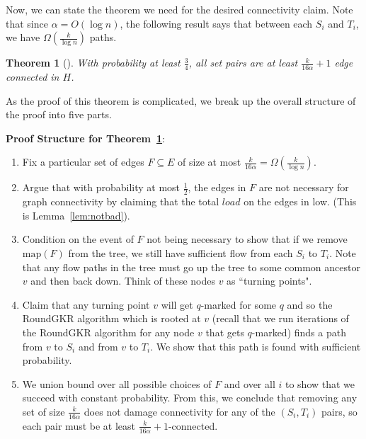 \documentclass[12pt]{article}
\newtheorem{theorem}{Theorem}
\begin{document}
Now, we can state the theorem we need for the desired connectivity claim. Note that since $\alpha = O(\log n)$, the following result says that between each $S_i$ and $T_i$, we have $\Omega(\frac{k}{\log n})$ paths.

\begin{theorem}[\cite{ssc}]
\label{theorem:connected}
With probability at least $\frac{3}{4}$, all set pairs are at least $\frac{k}{16\alpha} + 1$ edge connected in $H$. 
\end{theorem}

As the proof of this theorem is complicated, we break up the overall structure of the proof into five parts.

\textbf{Proof Structure for Theorem~\ref{theorem:connected}}:
\begin{enumerate}
\item Fix a particular set of edges $F \subseteq E$ of size at most $\frac{k}{16\alpha} = \Omega(\frac{k}{\log n})$. 
\item Argue that with probability at most $\frac{1}{2}$, the edges in $F$ are not necessary for graph connectivity by claiming that the total $load$ on the edges in low. (This is Lemma~\ref{lem:notbad}). 
\item Condition on the event of $F$ not being necessary to show that if we remove $\text{map}(F)$ from the tree, we still have sufficient flow from each $S_i$ to $T_i$. Note that any flow paths in the tree must go up the tree to some common ancestor $v$ and then back down. Think of these nodes $v$ as ``turning points".
\item Claim that any turning point $v$ will get $q$-marked for some $q$ and so the RoundGKR algorithm which is rooted at $v$ (recall that we run iterations of the RoundGKR algorithm for any node $v$ that gets $q$-marked) finds a path from $v$ to $S_i$ and from $v$ to $T_i$. We show that this path is found with sufficient probability.
\item We union bound over all possible choices of $F$ and over all $i$ to show that we succeed with constant probability. From this, we conclude that removing any set of size $\frac{k}{16 \alpha}$ does not damage connectivity for any of the $(S_i,T_i)$ pairs, so each pair must be at least $\frac{k}{16\alpha} + 1$-connected.
\end{enumerate}
\end{document}

